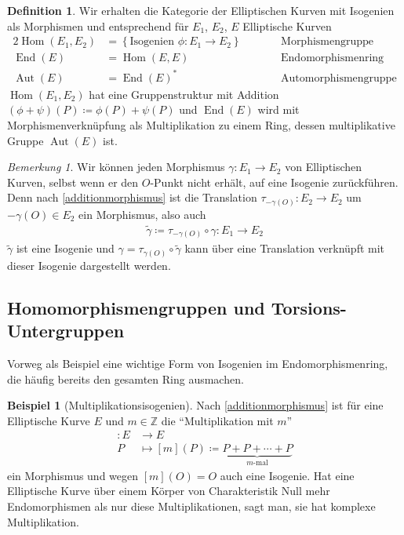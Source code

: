 \documentclass[english, german, parskip=half]{scrartcl}
\theoremstyle{definition}
\newtheorem{Definition}[Satz]{Definition}
\newtheorem{Beispiel}[Satz]{Beispiel}
\theoremstyle{remark}
\newtheorem{Bemerkung}[Satz]{Bemerkung}
\newcommand*{\Z}{\mathds{Z}}
\newcommand*{\longto}{\longrightarrow}
\renewcommand{\O}{O}
\DeclareMathOperator{\Hom}{Hom} %
\DeclareMathOperator{\End}{End} %
\DeclareMathOperator{\Aut}{Aut} %
\begin{document}
\begin{Definition}
  Wir erhalten die Kategorie der Elliptischen Kurven mit Isogenien als
  Morphismen und entsprechend für $E_1$, $E_2$, $E$ Elliptische Kurven
  \begin{alignat*}{2}
    \Hom(E_1, E_2)&=\left\{\text{Isogenien }\phi\colon E_1\to E_2 \right\}
    \qquad&&\text{Morphismengruppe}
    \\
    \End(E)&=\Hom(E,E)
    &&\text{Endomorphismenring}\\
    \Aut(E)&=\End(E)^*
    &&\text{Automorphismengruppe} 
  \end{alignat*}
  $\Hom(E_1, E_2)$ hat eine Gruppenstruktur mit Addition
  $(\phi+\psi)(P)\coloneqq \phi(P)+\psi(P)$ 
  und $\End(E)$ wird mit Morphismenverknüpfung als Multiplikation zu 
  einem Ring, dessen multiplikative Gruppe $\Aut(E)$ ist.
\end{Definition}

\begin{Bemerkung}
Wir können jeden Morphismus $\gamma\colon E_1\to E_2$ von Elliptischen
Kurven, selbst wenn er den $\O$-Punkt nicht erhält, auf eine Isogenie
zurückführen.
Denn nach \autoref{additionmorphismus} ist die Translation
$\tau_{-\gamma(\O)}\colon E_2\to E_2$ um $-\gamma(\O)\in E_2$
ein Morphismus, also auch 
\begin{gather*}
  \widetilde{\gamma}\coloneqq\tau_{-\gamma(\O)}\circ \gamma\colon E_1\to E_2
\end{gather*}
$\widetilde{\gamma}$ ist eine Isogenie und $\gamma=\tau_{\gamma(\O)}\circ \widetilde{\gamma}$ kann über
eine Translation verknüpft mit dieser Isogenie dargestellt werden.
\end{Bemerkung}

\subsection{Homomorphismengruppen und Torsions-Untergruppen}
Vorweg als Beispiel eine wichtige Form von Isogenien im
Endomorphismenring, die häufig bereits den gesamten Ring ausmachen.
\begin{Beispiel}[Multiplikationsisogenien]
  Nach \autoref{additionmorphismus} ist für eine Elliptische Kurve $E$
  und $m\in\Z$ die \enquote{Multiplikation mit $m$}
  \begin{align*}
    [m]\colon E &\longto E\\
    P&\longmapsto [m](P) \coloneqq
       \underbrace{P+P+\dotsb+P}_{m\text{-mal}}
  \end{align*}
  ein Morphismus und wegen $[m](\O)=\O$ auch eine Isogenie.
  Hat eine Elliptische Kurve über einem Körper von Charakteristik Null
  mehr Endomorphismen als nur diese Multiplikationen, sagt man,
  sie hat komplexe Multiplikation.
\end{Beispiel}
\end{document}
